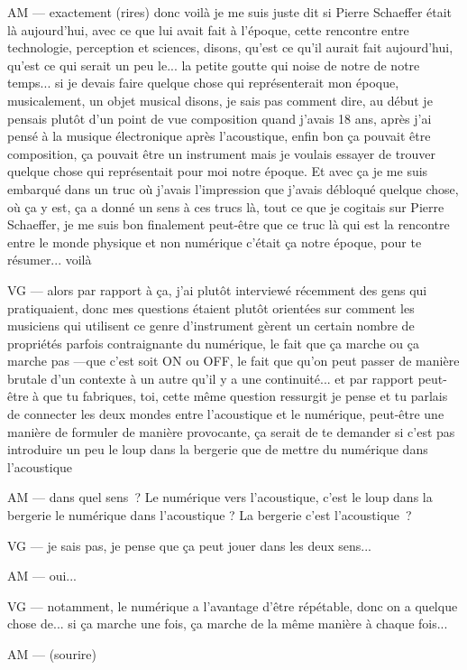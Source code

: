 AM — exactement (rires) donc voilà je me suis juste dit si Pierre Schaeffer était là aujourd'hui, avec ce que lui avait fait à l'époque, cette rencontre entre technologie, perception et sciences, disons, qu'est ce qu'il aurait fait aujourd'hui, qu'est ce qui serait un peu le... la petite goutte qui noise de notre de notre temps... si je devais faire quelque chose qui représenterait mon époque, musicalement, un objet musical disons, je sais pas comment dire, au début je pensais plutôt d'un point de vue composition quand j'avais 18 ans, après j'ai pensé à la musique électronique après l'acoustique, enfin bon ça pouvait être composition, ça pouvait être un instrument mais je voulais essayer de trouver quelque chose qui représentait pour moi notre époque. Et avec ça je me suis embarqué dans un truc où j'avais l'impression que j'avais débloqué quelque chose, où ça y est, ça a donné un sens à ces trucs là, tout ce que je cogitais sur Pierre Schaeffer, je me suis bon finalement peut-être que ce truc là qui est la rencontre entre le monde physique et non numérique c'était ça notre époque, pour te résumer... voilà

VG — alors par rapport à ça, j'ai plutôt interviewé récemment des gens qui pratiquaient, donc mes questions étaient plutôt orientées sur comment les musiciens qui utilisent ce genre d'instrument gèrent un certain nombre de propriétés parfois contraignante du numérique, le fait que ça marche ou ça marche pas —que c'est soit ON ou OFF, le fait que qu'on peut passer de manière brutale d'un contexte à un autre qu'il y a une continuité... et par rapport peut-être à que tu fabriques, toi, cette même question ressurgit je pense et tu parlais de connecter les deux mondes entre l'acoustique et le numérique, peut-être une manière de formuler de manière provocante, ça serait de te demander si c'est pas introduire un peu le loup dans la bergerie que de mettre du numérique dans l'acoustique 

AM — dans quel sens ? Le numérique vers l'acoustique, c'est le loup dans la bergerie le numérique dans l'acoustique ? La bergerie c'est l'acoustique ?

VG — je sais pas, je pense que ça peut jouer dans les deux sens... 

AM — oui... 

VG — notamment, le numérique a l'avantage d'être répétable, donc on a quelque chose de... si ça marche une fois, ça marche de la même manière à chaque fois... 

AM — (sourire)

